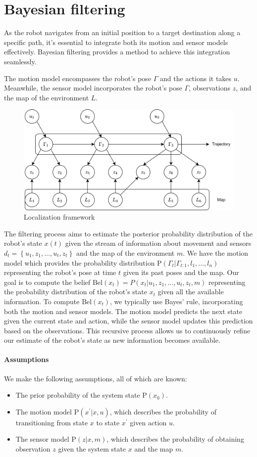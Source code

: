 \section{Bayesian filtering}

As the robot navigates from an initial position to a target destination along a specific path, it's essential to integrate both its motion and sensor models effectively. 
Bayesian filtering provides a method to achieve this integration seamlessly.

The motion model encompasses the robot's pose $\Gamma$ and the actions it takes $u$. 
Meanwhile, the sensor model incorporates the robot's pose $\Gamma$, observations $z$, and the map of the environment $L$. 
\begin{figure}[H]
    \centering
    \includegraphics[width=0.75\linewidth]{images/slam.png}
    \caption{Localization framework}
\end{figure}
The filtering process aims to estimate the posterior probability distribution of the robot's state $x(t)$ given the stream of information about movement and sensors 
$d_t=\left\{u_1,z_1,\dots,u_t,z_t\right\}$ and the map of the environment $m$.
We have the motion model which provides the probability distribution $\text{P}(\Gamma_t|\Gamma_{t:1},l_1,\dots,l_n)$ representing the robot's pose at time $t$ given its past poses and the map.
Our goal is to compute the belief $\text{Bel}(x_t)=P(x_t|u_1,z_1,\dots,u_t,z_t,m)$ representing the probability distribution of the robot's state $x_t$ given all the available information.
To compute $\text{Bel}(x_t)$, we typically use Bayes' rule, incorporating both the motion and sensor models. The motion model predicts the next state given the current state and action, while the sensor model updates this prediction based on the observations. This recursive process allows us to continuously refine our estimate of the robot's state as new information becomes available.

\paragraph*{Assumptions}
We make the following assumptions, all of which are known:
\begin{itemize}
    \item The prior probability of the system state $\text{P}(x_0)$. 
    \item The motion model $\text{P}(x^\prime|x, u)$, which describes the probability of transitioning from state $x$ to state $x^\prime$ given action $u$.
    \item The sensor model $\text{P}(z|x, m)$, which describes the probability of obtaining observation $z$ given the system state $x$ and the map $m$.
\end{itemize}

